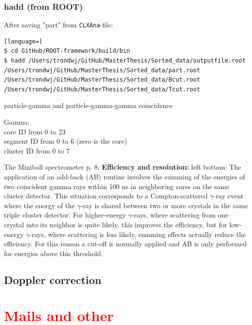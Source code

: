 \documentclass[twoside,english]{uiofysmaster/uiofysmaster}
\newcommand{\ga}{$\gamma$}
\begin{document}
\subsubsection{hadd (from ROOT)}
After saving "part" from \texttt{CLXAna}-file:
\begin{lstlisting}[language=]
$ cd GitHub/ROOT-framework/build/bin
$ hadd /Users/trondwj/GitHub/MasterThesis/Sorted_data/outputfile.root /Users/trondwj/GitHub/MasterThesis/Sorted_data/part.root /Users/trondwj/GitHub/MasterThesis/Sorted_data/Bcut.root /Users/trondwj/GitHub/MasterThesis/Sorted_data/Tcut.root 
\end{lstlisting}



\bigskip

particle-gamma and particle-gamma-gamma coincidence

\bigskip

Gamma: \\
core ID from 0 to 23 \\
segment ID from 0 to 6 (zero is the core) \\
cluster ID from 0 to 7 \\

\bigskip

The Miniball spectrometer \cite{MB-spect} \newline
p. 8: \newline
\textbf{Efficiency and resolution:}
left bottom: \newline
The application of an add-back (AB) routine involves the summing of the energies of two coincident gamma rays within 100 ns in neighboring cores on the same cluster detector. This situation corresponds to a Compton-scattered \ga-ray event where the energy of the \ga-ray is shared between two or more crystals in the same triple cluster detector. For higher-energy \ga-rays, where scattering from one crystal into its neighbor is quite likely, this improves the efficiency, but for low-energy \ga-rays, where scattering is less likely, summing effects actually reduce the efficiency. For this reason a cut-off is normally applied and AB is only performed for energies above this threshold. \newline


\subsection{Doppler correction}


\section*{\textcolor{red}{Mails and other}}
\end{document}
